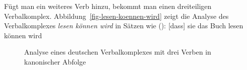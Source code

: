 Fügt man ein weiteres Verb hinzu, bekommt man einen dreiteiligen Verbalkomplex. Abbildung~\vref{fig-lesen-koennen-wird} zeigt die Analyse des Verbalkomplexes \emph{lesen können wird}
in Sätzen wie ():
\ea
\label{ex-lesen-koennen-wird}
{[}dass{]} sie das Buch lesen können wird
\z
\begin{figure}
\caption{\label{fig-lesen-koennen-wird}Analyse eines deutschen Verbalkomplexes mit drei Verben in kanonischer Abfolge}
\end{figure}

